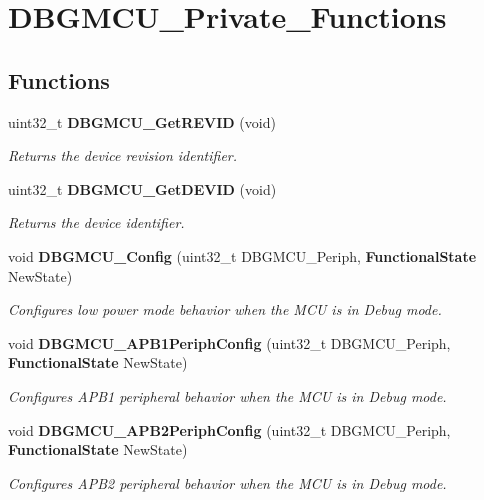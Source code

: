\section{D\+B\+G\+M\+C\+U\+\_\+\+Private\+\_\+\+Functions}
\label{group__DBGMCU__Private__Functions}
\subsection*{Functions}
\begin{DoxyCompactItemize}
\item 
uint32\+\_\+t \textbf{ D\+B\+G\+M\+C\+U\+\_\+\+Get\+R\+E\+V\+ID} (void)
\begin{DoxyCompactList}\small\item\em Returns the device revision identifier. \end{DoxyCompactList}\item 
uint32\+\_\+t \textbf{ D\+B\+G\+M\+C\+U\+\_\+\+Get\+D\+E\+V\+ID} (void)
\begin{DoxyCompactList}\small\item\em Returns the device identifier. \end{DoxyCompactList}\item 
void \textbf{ D\+B\+G\+M\+C\+U\+\_\+\+Config} (uint32\+\_\+t D\+B\+G\+M\+C\+U\+\_\+\+Periph, \textbf{ Functional\+State} New\+State)
\begin{DoxyCompactList}\small\item\em Configures low power mode behavior when the M\+CU is in Debug mode. \end{DoxyCompactList}\item 
void \textbf{ D\+B\+G\+M\+C\+U\+\_\+\+A\+P\+B1\+Periph\+Config} (uint32\+\_\+t D\+B\+G\+M\+C\+U\+\_\+\+Periph, \textbf{ Functional\+State} New\+State)
\begin{DoxyCompactList}\small\item\em Configures A\+P\+B1 peripheral behavior when the M\+CU is in Debug mode. \end{DoxyCompactList}\item 
void \textbf{ D\+B\+G\+M\+C\+U\+\_\+\+A\+P\+B2\+Periph\+Config} (uint32\+\_\+t D\+B\+G\+M\+C\+U\+\_\+\+Periph, \textbf{ Functional\+State} New\+State)
\begin{DoxyCompactList}\small\item\em Configures A\+P\+B2 peripheral behavior when the M\+CU is in Debug mode. \end{DoxyCompactList}\end{DoxyCompactItemize}


